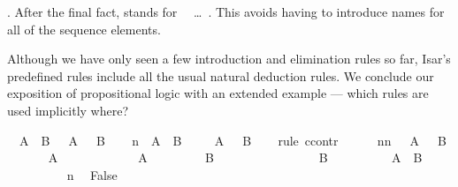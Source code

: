\begin{isabellebody}
\begin{isamarkuptext}
. After the final fact,  stands
for ~~\dots~.  This avoids having to
introduce names for all of the sequence elements.%
\end{isamarkuptext}%
\isamarkuptrue%
%
\begin{isamarkuptext}%
Although we have only seen a few introduction and elimination rules so
far, Isar's predefined rules include all the usual natural deduction
rules. We conclude our exposition of propositional logic with an extended
example --- which rules are used implicitly where?%
\end{isamarkuptext}%
\isamarkuptrue%
\isamarkupfalse%
\ {\isachardoublequoteopen}{\isasymnot}\ {\isacharparenleft}A\ {\isasymand}\ B{\isacharparenright}\ {\isasymlongrightarrow}\ {\isasymnot}\ A\ {\isasymor}\ {\isasymnot}\ B{\isachardoublequoteclose}\isanewline
%
\isadelimproof
%
\endisadelimproof
%
\isatagproof
{}\isamarkupfalse%
\isanewline
\ \ \isamarkupfalse%
\ n{\isacharcolon}\ {\isachardoublequoteopen}{\isasymnot}\ {\isacharparenleft}A\ {\isasymand}\ B{\isacharparenright}{\isachardoublequoteclose}\isanewline
\ \ \isamarkupfalse%
\ {\isachardoublequoteopen}{\isasymnot}\ A\ {\isasymor}\ {\isasymnot}\ B{\isachardoublequoteclose}\isanewline
\ \ \isamarkupfalse%
\ {\isacharparenleft}rule\ ccontr{\isacharparenright}\isanewline
\ \ \ \ \isamarkupfalse%
\ nn{\isacharcolon}\ {\isachardoublequoteopen}{\isasymnot}\ {\isacharparenleft}{\isasymnot}\ A\ {\isasymor}\ {\isasymnot}\ B{\isacharparenright}{\isachardoublequoteclose}\isanewline
\ \ \ \ \isamarkupfalse%
\ {\isachardoublequoteopen}{\isasymnot}\ A{\isachardoublequoteclose}\isanewline
\ \ \ \ \isamarkupfalse%
\isanewline
\ \ \ \ \ \ \isamarkupfalse%
\ {\isachardoublequoteopen}A{\isachardoublequoteclose}\isanewline
\ \ \ \ \ \ \isamarkupfalse%
\ {\isachardoublequoteopen}{\isasymnot}\ B{\isachardoublequoteclose}\isanewline
\ \ \ \ \ \ \isamarkupfalse%
\isanewline
\ \ \ \ \ \ \ \ \isamarkupfalse%
\ {\isachardoublequoteopen}B{\isachardoublequoteclose}\isanewline
\ \ \ \ \ \ \ \ \isamarkupfalse%
\ {\isachardoublequoteopen}A\ {\isasymand}\ B{\isachardoublequoteclose}\ \isacommand{{\isachardot}{\isachardot}}\isamarkupfalse%
\isanewline
\ \ \ \ \ \ \ \ \isamarkupfalse%
\ n\ \isamarkupfalse%
\ False\ \isacommand{{\isachardot}{\isachardot}}\isamarkupfalse%

\end{isabellebody}
